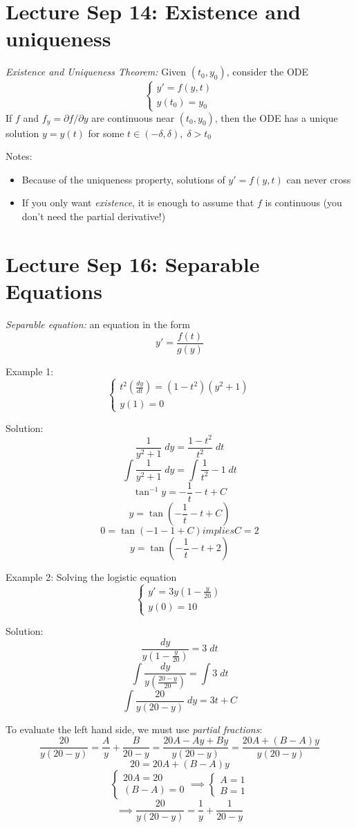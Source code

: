 \documentclass[12pt]{article}
\begin{document}
\section{Lecture Sep 14: Existence and uniqueness}
\emph{Existence and Uniqueness Theorem:}
Given $(t_0, y_0)$, consider the ODE 
\[\begin{cases}
    y' = f(y, t)\\
    y(t_0) = y_0
\end{cases}\]
If $f$ and $f_y = \partial f / \partial y$ are continuous near $(t_0, y_0)$, then the ODE has a unique solution $y = y(t)$ for some $t \in (-\delta, \delta), \; \delta > t_0$

Notes:
\begin{itemize}
    \item Because of the uniqueness property, solutions of $y' = f(y, t)$ can never cross
    \item If you only want \emph{existence}, it is enough to assume that $f$ is continuous (you don't need the partial derivative!) 
\end{itemize}

\section{Lecture Sep 16: Separable Equations}
\emph{Separable equation:} an equation in the form 
\[y' = \frac{f(t)}{g(y)}\]

Example 1:
\[\begin{cases}
    t^2 \left(\frac{dy}{dt}\right) = (1 -t^2)(y^2 + 1)\\
    y(1) = 0
\end{cases}\]

Solution:
\[\frac{1}{y^2 + 1} \; dy = \frac{1 - t^2}{t^2} \; dt\]
\[\int \frac{1}{y^2 + 1} \; dy = \int \frac{1}{t^2} - 1 \; dt\]
\[\tan^{-1} y = -\frac{1}{t} - t + C\]
\[y = \tan \left(-\frac{1}{t} - t + C\right)\]
\[0 = \tan (-1 - 1 + C) implies C = 2\]
\[\boxed{y = \tan \left(-\frac{1}{t} - t + 2\right)}\]

Example 2: Solving the logistic equation
\[\begin{cases}
    y' = 3y\left(1 - \frac{y}{20}\right)\\
    y(0) = 10
\end{cases}\]

Solution:
\[\frac{dy}{y (1 - \frac{y}{20})} = 3\; dt\]
\[\int \frac{dy}{y (\frac{20 - y}{20})} = \int 3 \; dt\]
\[\int \frac{20}{y(20 - y)}\; dy = 3t + C\]

To evaluate the left hand side, we must use \emph{partial fractions}:
\[\frac{20}{y(20 - y)} = \frac{A}{y} + \frac{B}{20 - y} = \frac{20A - Ay + By}{y(20 - y)} = \frac{20A + (B - A)y}{y(20 - y)}\]
\[20 = 20A + (B - A)y\]
\[\begin{cases}
    20A = 20\\
    (B - A) = 0
\end{cases} \implies \begin{cases}
    A = 1\\
    B = 1
\end{cases}\]
\[\implies \frac{20}{y (20 - y)} = \frac{1}{y} + \frac{1}{20 - y}\]
\end{document}
